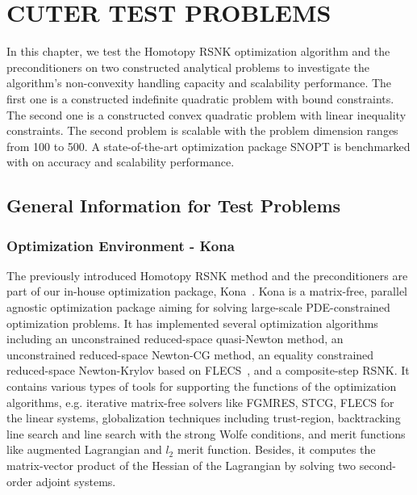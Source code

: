  
\chapter{CUTER TEST PROBLEMS}

In this chapter, we test the Homotopy RSNK optimization algorithm and the preconditioners 
on two constructed analytical problems to investigate the algorithm's non-convexity 
handling capacity and scalability performance. The first one is a constructed indefinite 
quadratic problem with bound constraints. The second one is a constructed convex 
quadratic problem with linear inequality constraints. The second problem is scalable with 
the problem dimension ranges from 100 to 500. A state-of-the-art optimization package 
SNOPT is benchmarked with on accuracy and scalability performance.   

\section{General Information for Test Problems}
\subsection{Optimization Environment - Kona}\label{sec:kona_mv}
The previously introduced Homotopy RSNK method and the preconditioners are part of 
our in-house optimization package, Kona~\cite{dener:scitech2016}. Kona is a matrix-free, 
parallel agnostic optimization package aiming for solving large-scale PDE-constrained 
optimization problems.  It has implemented several optimization 
algorithms including an unconstrained 
reduced-space quasi-Newton method, an unconstrained reduced-space 
Newton-CG method, an equality constrained reduced-space Newton-Krylov 
based on FLECS~\cite{hicken:flecs2014}, and a composite-step RSNK.    
It contains various types of tools for supporting the functions of the optimization algorithms, e.g. 
iterative matrix-free solvers like FGMRES, STCG, FLECS for the linear systems, 
globalization techniques including trust-region, backtracking line search and line search with 
the strong Wolfe conditions, and merit functions like augmented Lagrangian and $l_2$ 
merit function. Besides, it computes the matrix-vector product of the Hessian of the Lagrangian 
by solving two second-order adjoint systems. 

